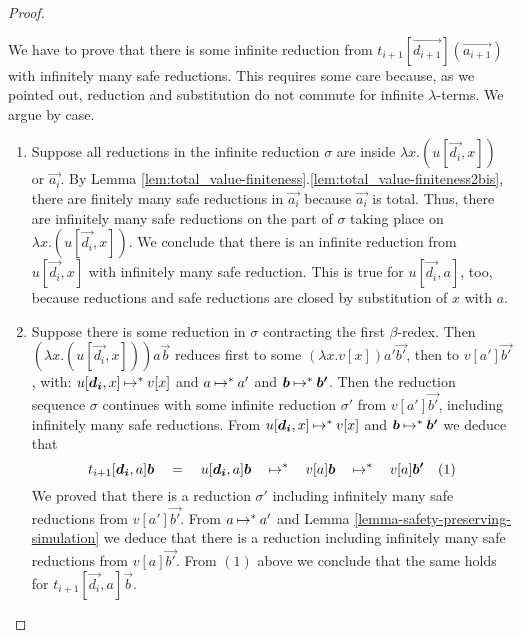 \begin{proof}
\begin{enumerate}
  We have to prove that there is some infinite reduction from 
  $t_{i+1}[\vec{d_{i+1}}](\vec{a_{i+1}})$ with infinitely
  many safe reductions. This requires some care because, as we pointed out,
  reduction and substitution do not commute for infinite $\lambda$-terms.
  We argue by case.

\begin{enumerate}
\item
 Suppose all reductions in the infinite reduction $\sigma$ 
  are inside $\lambda x.(u[\vec{d_i},x])$ or $\vec{a_i}$.
 By Lemma \ref{lem:total_value-finiteness}.\ref{lem:total_value-finiteness2bis},
  there are finitely many safe reductions in $\vec{a_i}$ because $\vec{a_i}$ is total.
 Thus, there are infinitely many safe reductions on the part of $\sigma$
  taking place on $\lambda x.(u[\vec{d_i},x])$.
  We conclude that there is an infinite reduction from $u[\vec{d_i},x]$ 
  with infinitely many safe reduction. This is true for $u[\vec{d_i},a]$, too, 
  because reductions and safe reductions are closed by substitution of $x$ with $a$.
  

\item
 Suppose there is some reduction in $\sigma$ contracting the first $\beta$-redex.
 Then  $(\lambda x.(u[\vec{d_i},x]))a\vec{b}$ reduces first to some
 $ (\lambda x.v[x])a'\vec{b'}$, then to $v[a']\vec{b'}$, with: 
 $u[\vec{d_i},x] \reduces^{*} v[x]$ and 
 $a\mathbin{\mapsto}^{*} a'$ and $\vec{b} \reduces^{*} \vec{b'}$.
 Then the reduction sequence $\sigma$ continues with some infinite reduction $\sigma'$ from 
  $v[a']\vec{b'}$, including infinitely many safe reductions. 
 From $u[\vec{d_i},x] \reduces^{*} v[x]$ and $\vec{b} \reduces^{*} \vec{b'}$ we deduce that 
 \[
 t_{i+1}[\vec{d_i},a]\vec{b}  
 \quad =\quad
 u[\vec{d_i},a]\vec{b} 
 \quad\reduces^{*}\quad
 v[a]\vec{b}
 \quad\reduces^{*}\quad
 v[a]\vec{b'} 
 \ \ \ \mbox{(1)}
 \]
 We proved that there is a reduction $\sigma'$ 
 including infinitely many safe reductions from  $v[a']\vec{b'}$.
 From $a \mathbin{\mapsto}^{*} a'$ and Lemma \ref{lemma-safety-preserving-simulation}
 we deduce that there is a reduction including infinitely many safe reductions from  
 $v[a]\vec{b'}$. From $(1)$ above we conclude that the same holds for
 $t_{i+1}[\vec{d_i},a]\vec{b}$.
\end{enumerate}


\end{enumerate}
\end{proof}
